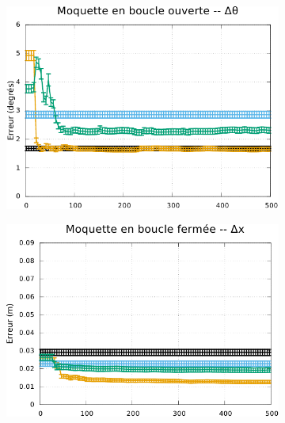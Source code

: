 \begin{figure}[htb]
\begin{subfigure}{0.29\paperwidth}
        \includegraphics[type=pdf,ext=.pdf,read=.pdf,width=1.0\linewidth]{../plot/OdometryLWPR/carpet_open_convergence_yaw}
    \end{subfigure}
    \vspace{0.1cm}
    \newline
    \begin{subfigure}{0.29\paperwidth}
        \centering
        \includegraphics[type=pdf,ext=.pdf,read=.pdf,width=1.0\linewidth]{../plot/OdometryLWPR/carpet_close_convergence_x}
    \end{subfigure}
    \begin{subfigure}{0.29\paperwidth}
        \centering

\end{subfigure}
\end{figure}
